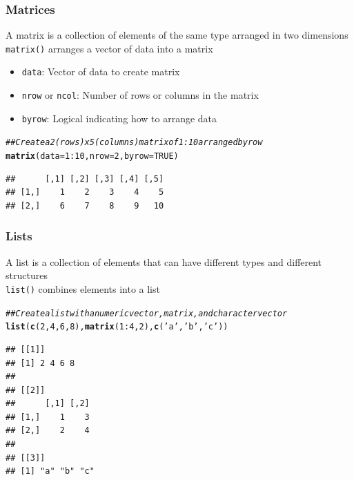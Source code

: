 \documentclass{beamer}\usepackage[]{graphicx}\usepackage[]{color}
\makeatletter
\newcommand{\hlnum}[1]{\textcolor[rgb]{0.686,0.059,0.569}{#1}}%
\newcommand{\hlstr}[1]{\textcolor[rgb]{0.192,0.494,0.8}{#1}}%
\newcommand{\hlcom}[1]{\textcolor[rgb]{0.678,0.584,0.686}{\textit{#1}}}%
\newcommand{\hlopt}[1]{\textcolor[rgb]{0,0,0}{#1}}%
\newcommand{\hlstd}[1]{\textcolor[rgb]{0.345,0.345,0.345}{#1}}%
\newcommand{\hlkwc}[1]{\textcolor[rgb]{0.333,0.667,0.333}{#1}}%
\newcommand{\hlkwd}[1]{\textcolor[rgb]{0.737,0.353,0.396}{\textbf{#1}}}%
\newenvironment{kframe}{%
 \def\at@end@of@kframe{}%
 \ifinner\ifhmode%
  \def\at@end@of@kframe{\end{minipage}}%
  \begin{minipage}{\columnwidth}%
 \fi\fi%
 \def\FrameCommand##1{\hskip\@totalleftmargin \hskip-\fboxsep
 \colorbox{shadecolor}{##1}\hskip-\fboxsep
     \hskip-\linewidth \hskip-\@totalleftmargin \hskip\columnwidth}%
 \MakeFramed {\advance\hsize-\width
   \@totalleftmargin\z@ \linewidth\hsize
   \@setminipage}}%
 {\par\unskip\endMakeFramed%
 \at@end@of@kframe}
\newenvironment{knitrout}{}{} %
\makeatother
\begin{document}
\begin{frame}[fragile]\frametitle{Matrices}
    A matrix is a collection of elements of the same type arranged in two dimensions \\
    \vspace{3ex}
    \texttt{matrix()} arranges a vector of data into a matrix
    \begin{itemize}
        \item \texttt{data}: Vector of data to create matrix
        \item \texttt{nrow} or \texttt{ncol}: Number of rows or columns in the matrix
        \item \texttt{byrow}: Logical indicating how to arrange data
    \end{itemize}
\begin{knitrout}\footnotesize
{}\color{fgcolor}\begin{kframe}
\begin{alltt}
\hlcom{## Create a 2 (rows) x 5 (columns) matrix of 1:10 arranged by row}
\hlkwd{matrix}\hlstd{(}\hlkwc{data} \hlstd{=} \hlnum{1}\hlopt{:}\hlnum{10}\hlstd{,} \hlkwc{nrow} \hlstd{=} \hlnum{2}\hlstd{,} \hlkwc{byrow} \hlstd{=} \hlnum{TRUE}\hlstd{)}
\end{alltt}
\begin{verbatim}
##      [,1] [,2] [,3] [,4] [,5]
## [1,]    1    2    3    4    5
## [2,]    6    7    8    9   10
\end{verbatim}
\end{kframe}
\end{knitrout}
\end{frame}

\begin{frame}[fragile]\frametitle{Lists}
    A list is a collection of elements that can have different types and different structures \\
    \vspace{3ex}
    \texttt{list()} combines elements into a list
\begin{knitrout}\footnotesize
{}\color{fgcolor}\begin{kframe}
\begin{alltt}
\hlcom{## Create a list with a numeric vector, matrix, and character vector}
\hlkwd{list}\hlstd{(}\hlkwd{c}\hlstd{(}\hlnum{2}\hlstd{,} \hlnum{4}\hlstd{,} \hlnum{6}\hlstd{,} \hlnum{8}\hlstd{),} \hlkwd{matrix}\hlstd{(}\hlnum{1}\hlopt{:}\hlnum{4}\hlstd{,} \hlnum{2}\hlstd{),} \hlkwd{c}\hlstd{(}\hlstr{'a'}\hlstd{,} \hlstr{'b'}\hlstd{,} \hlstr{'c'}\hlstd{))}
\end{alltt}
\begin{verbatim}
## [[1]]
## [1] 2 4 6 8
## 
## [[2]]
##      [,1] [,2]
## [1,]    1    3
## [2,]    2    4
## 
## [[3]]
## [1] "a" "b" "c"
\end{verbatim}
\end{kframe}
\end{knitrout}
\end{frame}
\end{document}
